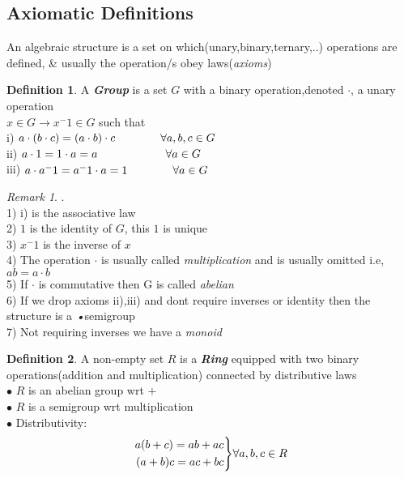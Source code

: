 \documentclass{article}
\theoremstyle{plain}
\theoremstyle{definition}
\newtheorem{defn}{Definition}[section]
\theoremstyle{remark}
\newtheorem*{rem}{Remark}
\newenvironment{rcases}
  {\left.\begin{aligned}}
  {\end{aligned}\right\rbrace}
\begin{document}
\subsection{Axiomatic Definitions}

An algebraic structure is a set on which(unary,binary,ternary,..) operations are defined, \& usually the operation/s obey laws(\textit{axioms})\\
\begin{defn}
	A \textbf{\textit{Group}} is a set $G$ with a binary operation,denoted $\cdot$, a unary operation\\
	$x \in G \rightarrow x^-1 \in G$ such that\\
		i) $a \cdot (b \cdot c) = (a \cdot b) \cdot c \hspace{40px} \forall a,b,c \in G$\\
		ii) $a \cdot 1 = 1 \cdot a = a \hspace{60px} \forall a \in G$ \\
		iii) $a \cdot a^-1 = a^-1 \cdot a = 1 \hspace{40px} \forall a \in G$
\end{defn}
\begin{rem} . \\
	1) i) is the associative law\\
	2) $1$ is the identity of $G$, this $1$ is unique\\
	3) $x^-1$ is the inverse of $x$\\
	4) The operation $\cdot$ is usually called \textit{multiplication} and is usually omitted i.e, $ab = a \cdot b$\\
	5) If $\cdot$ is commutative then G is called \textit{abelian}\\
	6) If we drop axioms ii),iii) and dont require inverses or identity then the structure is a \textit{•}{semigroup}\\
	7) Not requiring inverses we have a \textit{monoid}\\
\end{rem}

\begin{defn}
	A non-empty set $R$ is a \textbf{\textit{Ring}} equipped with two binary operations(addition and multiplication) connected by distributive laws\\
	$\bullet$ $R$ is an abelian group wrt $+$\\
	$\bullet$ $R$ is a semigroup wrt multiplication\\
	$\bullet$ Distributivity:\\
	\begin{equation}
	\begin{rcases}
		a(b + c) = ab + ac \\
		(a + b)c = ac + bc 
	\end{rcases} \forall a,b,c \in R
	\end{equation}
\end{defn}
\end{document}
